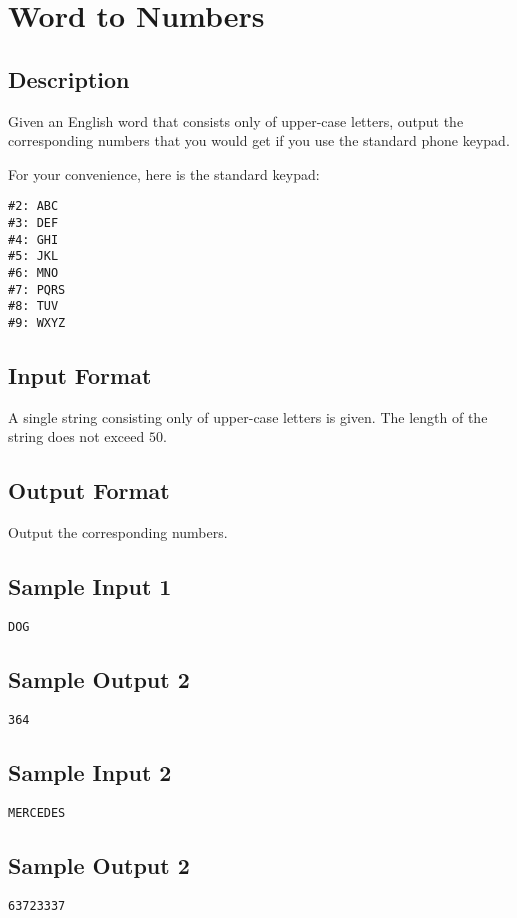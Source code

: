 \newpage

\section{Word to Numbers}

\subsection*{Description}
Given an English word that consists only of upper-case letters, output the corresponding numbers that you would get if you use the standard phone keypad.

For your convenience, here is the standard keypad:
\begin{verbatim}
#2: ABC
#3: DEF
#4: GHI
#5: JKL
#6: MNO
#7: PQRS
#8: TUV
#9: WXYZ
\end{verbatim}

\subsection*{Input Format}
A single string consisting only of upper-case letters is given.
The length of the string does not exceed $50$.

\subsection*{Output Format}
Output the corresponding numbers.

\subsection*{Sample Input 1}
\begin{verbatim}
DOG
\end{verbatim}

\subsection*{Sample Output 2}
\begin{verbatim}
364
\end{verbatim}

\subsection*{Sample Input 2}
\begin{verbatim}
MERCEDES
\end{verbatim}

\subsection*{Sample Output 2}
\begin{verbatim}
63723337
\end{verbatim}




